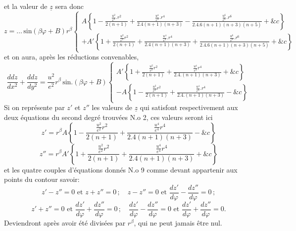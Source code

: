 \documentclass[11pt,a4paper]{article}
\begin{document}
et la valeur de $\underline{z}$ sera  donc
\[ z = \ldots\,\text{sin}(\beta\varphi + B)r^\beta\left\{\begin{array}{l} A\left\{1 - \frac{\frac{u^2}{e^2}.r^2}{2(n+1)} + \frac{\frac{u^4}{e^4}.r^4}{2.4(n+1)(n+3)} - \frac{\frac{u^6}{e^6}.r^6}{2.4.6(n+1)(n+3)(n+5)} + \&c\right\} \\ + A'\left\{1 + \frac{\frac{u^2}{e^2}r^2}{2(n+1)} + \frac{\frac{u^4}{e^4}.r^4}{2.4(n+1)(n+3)} + \frac{\frac{u^6}{e^6}.r^6}{2.4.6(n+1)(n+3)(n+5)} + \&c\right\} \end{array}\right. \]
et on  aura, après les réductions convenables,
\[ \frac{ddz}{dx^2} + \frac{ddz}{dy^2} = \frac{u^2}{e^2}r^\beta\,\text{sin}.(\beta\varphi + B)\left\{\begin{array}{l} A'\left\{1 + \frac{\frac{u^2}{e^2}r^2}{2(n+1)} + \frac{\frac{u^4}{e^4}r^4}{2.4.(n+1)(n+3)} + \&c\right\} \\ - A\left\{1 - \frac{\frac{u^2}{e^2}r^2}{2(n+1)} + \frac{\frac{u^4}{e^4}.r^4}{2.4.(n+1)(n+3)} - \&c\right\} \end{array}\right. \]
 Si on représente par $z'$ et $z''$ les valeurs de $\underline{z}$
qui satisfont  respectivement aux deux équations du
second degré trouvées N.o 2,  ces valeurs seront
ici
\[ z' = r^\beta A\left\{1 - \frac{\frac{u^2}{e^2}r^2}{2(n+1)} + \frac{\frac{u^4}{e^4}r^4}{2.4(n+1)(n+3)} - \&c\right\} \]
\[ z'' = r^\beta A'\left\{1 + \frac{\frac{u^2}{e^2}r^2}{2(n+1)} + \frac{\frac{u^4}{e^4}r^4}{2.4(n+1)(n+3)} + \&c\right\} \]
et les quatre couples d'équations donnés N.o 9 comme devant
appartenir aux points du contour savoir:
\[ z'-z''=0 \text{ et } z+z''=0\,; \quad z-z''=0 \text{ et } \frac{dz'}{d\varphi} - \frac{dz''}{d\varphi} = 0\,; \]
\[ z'+z''=0 \text{ et } \frac{dz'}{d\varphi} + \frac{dz''}{d\varphi} = 0\,; \quad \frac{dz'}{d\varphi} - \frac{dz''}{d\varphi} = 0 \text{ et } \frac{dz'}{d\varphi} + \frac{dz''}{d\varphi} = 0. \]
Deviendront après avoir été divisées par $r^\beta$,
qui ne peut jamais être nul.
\end{document}
